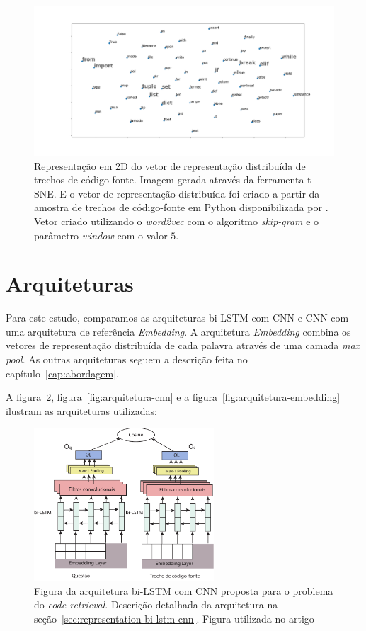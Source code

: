 \begin{figure}[h]
\includegraphics[width=1\textwidth]{figuras/cap-resultados-preliminares/code-tsne-output.png}
\caption{Representação em 2D do vetor de representação distribuída de trechos de código-fonte. Imagem gerada através da ferramenta t-SNE. E o vetor de representação distribuída foi criado a partir da amostra de trechos de código-fonte em Python disponibilizada por \cite{yao-2018}. Vetor criado utilizando o \textit{word2vec} com o algoritmo \textit{skip-gram} e o parâmetro \textit{window} com o valor $5$.}
\label{fig:tsne-code-snippet-python}
\end{figure}

\section{Arquiteturas}

Para este estudo, comparamos as arquiteturas bi-LSTM com CNN e CNN com uma arquitetura de referência \textit{Embedding}. A arquitetura \textit{Embedding} combina os vetores de representação distribuída de cada palavra através de uma camada \textit{max pool}. As outras arquiteturas seguem a descrição feita no capítulo~\ref{cap:abordagem}.

A figura~\ref{fig:arquitetura-bi-lstm-com-cnn}, figura~\ref{fig:arquitetura-cnn} e a figura~\ref{fig:arquitetura-embedding} ilustram as arquiteturas utilizadas:

\begin{figure}[h]
    \centering
    \includegraphics[width=0.6\textwidth]{figuras/cap-resultados-preliminares/ArquiteturaBiLSTM.pdf}
    \caption{Figura da arquitetura bi-LSTM com CNN proposta para o problema do \textit{code retrieval}. Descrição detalhada da arquitetura na seção~\ref{sec:representation-bi-lstm-cnn}. Figura utilizada no artigo \cite{marcelo-vem-2019}}
    \label{fig:arquitetura-bi-lstm-com-cnn}
\end{figure}

